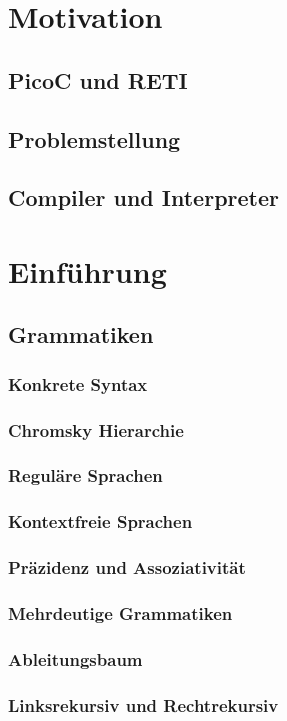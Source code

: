 \documentclass{scrreprt}
\begin{document}
  \chapter{Motivation}
  \section{PicoC und RETI}
  \section{Problemstellung}
  \section{Compiler und Interpreter}
  \chapter{Einführung}
  \section{Grammatiken}
  \subsection{Konkrete Syntax}
  \subsection{Chromsky Hierarchie}
  \subsection{Reguläre Sprachen}
  \subsection{Kontextfreie Sprachen}
  \subsection{Präzidenz und Assoziativität}
  \subsection{Mehrdeutige Grammatiken}
  \subsection{Ableitungsbaum}
  \subsection{Linksrekursiv und Rechtrekursiv}
\end{document}
